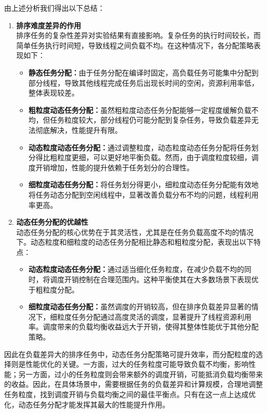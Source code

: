 \documentclass{nku}
\begin{document}
由上述分析我们得出以下总结：
\begin{enumerate}
    \item \textbf{排序难度差异的作用}\\
    排序任务的复杂性差异对实验结果有直接影响。复杂任务的执行时间较长，而简单任务执行时间短，导致线程之间负载不均。在这种情况下，各分配策略表现如下：
    \begin{itemize}
        \item \textbf{静态任务分配：}由于任务分配在编译时固定，高负载任务可能集中分配到部分线程，导致其他线程完成任务后出现长时间的空闲，资源利用率低，整体表现较差。
        \item \textbf{粗粒度动态任务分配：}虽然粗粒度动态任务分配能够一定程度缓解负载不均，但任务粒度较大，部分线程仍可能分配到复杂任务，导致负载差异无法彻底解决，性能提升有限。
        \item \textbf{动态粒度动态任务分配：}通过调整粒度，动态粒度动态任务分配将任务划分得比粗粒度更细，可以更好地平衡负载。然而，由于调度粒度较细，调度开销增加，性能的提升依赖于任务划分的合理性。
        \item \textbf{细粒度动态任务分配：}将任务划分得更小，细粒度动态任务分配能有效地将任务动态分配到空闲线程中，显著改善负载分布不均的问题，线程利用率更高。
    \end{itemize}
    \item \textbf{动态任务分配的优越性}\\
    动态任务分配的核心优势在于其灵活性，尤其是在任务负载高度不均的情况下。动态粒度和细粒度的动态任务分配相比静态和粗粒度分配，表现出以下特点：
    \begin{itemize}
        \item \textbf{动态粒度动态任务分配：}通过适当细化任务粒度，在减少负载不均的同时，将调度开销控制在合理范围内。这种平衡使其在大多数场景下表现优于粗粒度分配。
        \item \textbf{细粒度动态任务分配：}虽然调度的开销较高，但在排序负载差异显著的情况下，细粒度任务分配通过高度灵活的调度，显著提升了线程资源利用率。调度带来的负载均衡收益远大于开销，使得其整体性能优于其他分配策略。
    \end{itemize}
\end{enumerate}

因此在负载差异大的排序任务中，动态任务分配策略可提升效率，而分配粒度的选择则是性能优化的关键。一方面，过大的任务粒度可能导致负载不均衡，影响性能；另一方面，过小的任务粒度则会带来额外的调度开销，可能抵消负载均衡带来的收益。因此，在具体场景中，需要根据任务的负载差异和计算规模，合理地调整任务粒度，找到调度开销与负载均衡之间的最佳平衡点。只有在这一点上达成优化，动态任务分配才能发挥其最大的性能提升作用。
\end{document}
